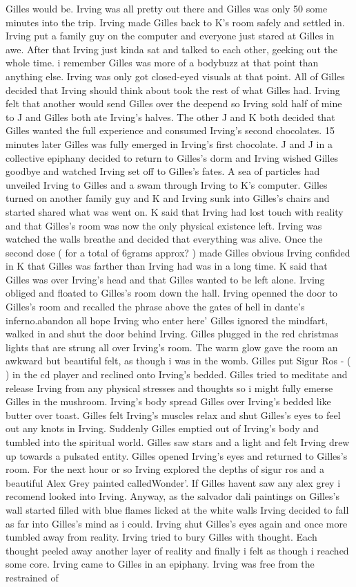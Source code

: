 \documentclass[12pt]{book}
\begin{document}
Gilles would be. Irving was all pretty out there and Gilles was only 50 some minutes into the trip. Irving made Gilles back to K's room safely and settled in. Irving put a family guy on the computer and everyone just stared at Gilles in awe. After that Irving just kinda sat and talked to each other, geeking out the whole time. i remember Gilles was more of a bodybuzz at that point than anything else. Irving was only got closed-eyed visuals at that point. All of Gilles decided that Irving should think about took the rest of what Gilles had. Irving felt that another would send Gilles over the deepend so Irving sold half of mine to J and Gilles both ate Irving's halves. The other J and K both decided that Gilles wanted the full experience and consumed Irving's second chocolates. 15 minutes later Gilles was fully emerged in Irving's first chocolate. J and J in a collective epiphany decided to return to Gilles's dorm and Irving wished Gilles goodbye and watched Irving set off to Gilles's fates. A sea of particles had unveiled Irving to Gilles and a swam through Irving to K's computer. Gilles turned on another family guy and K and Irving sunk into Gilles's chairs and started shared what was went on. K said that Irving had lost touch with reality and that Gilles's room was now the only physical existence left. Irving was watched the walls breathe and decided that everything was alive. Once the second dose ( for a total of 6grams approx? ) made Gilles obvious Irving confided in K that Gilles was farther than Irving had was in a long time. K said that Gilles was over Irving's head and that Gilles wanted to be left alone. Irving obliged and floated to Gilles's room down the hall. Irving openned the door to Gilles's room and recalled the phrase above the gates of hell in dante's inferno.abandon all hope Irving who enter here' Gilles ignored the mindfart, walked in and shut the door behind Irving. Gilles plugged in the red christmas lights that are strung all over Irving's room. The warm glow gave the room an awkward but beautiful felt, as though i was in the womb. Gilles put Sigur Ros - (  ) in the cd player and reclined onto Irving's bedded. Gilles tried to meditate and release Irving from any physical stresses and thoughts so i might fully emerse Gilles in the mushroom. Irving's body spread Gilles over Irving's bedded like butter over toast. Gilles felt Irving's muscles relax and shut Gilles's eyes to feel out any knots in Irving. Suddenly Gilles emptied out of Irving's body and tumbled into the spiritual world. Gilles saw stars and a light and felt Irving drew up towards a pulsated entity. Gilles opened Irving's eyes and returned to Gilles's room. For the next hour or so Irving explored the depths of sigur ros and a beautiful Alex Grey painted calledWonder'. If Gilles havent saw any alex grey i recomend looked into Irving. Anyway, as the salvador dali paintings on Gilles's wall started filled with blue flames licked at the white walls Irving decided to fall as far into Gilles's mind as i could. Irving shut Gilles's eyes again and once more tumbled away from reality. Irving tried to bury Gilles with thought. Each thought peeled away another layer of reality and finally i felt as though i reached some core. Irving came to Gilles in an epiphany. Irving was free from the restrained of 
\end{document}
